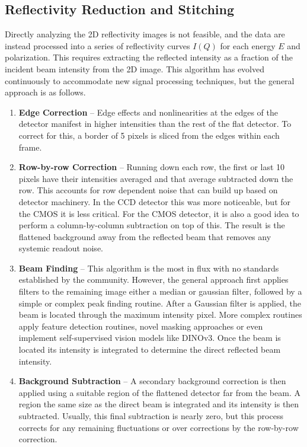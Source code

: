 \subsection{Reflectivity Reduction and Stitching}\label{sec:reflectivity-reduction-and-stitching}

Directly analyzing the 2D reflectivity images is not feasible, and the data are instead processed into a series of reflectivity curves \(I(Q)\) for each energy \(E\) and polarization. This requires extracting the reflected intensity as a fraction of the incident beam intensity from the 2D image. This algorithm has evolved continuously to accommodate new signal processing techniques, but the general approach is as follows.

\begin{enumerate}
\def\labelenumi{\arabic{enumi}.}
\item
  \textbf{Edge Correction} -- Edge effects and nonlinearities at the edges of the detector manifest in higher intensities than the rest of the flat detector. To correct for this, a border of 5 pixels is sliced from the edges within each frame.
\item
  \textbf{Row-by-row Correction} -- Running down each row, the first or last 10 pixels have their intensities averaged and that average subtracted down the row. This accounts for row dependent noise that can build up based on detector machinery. In the CCD detector this was more noticeable, but for the CMOS it is less critical. For the CMOS detector, it is also a good idea to perform a column-by-column subtraction on top of this. The result is the flattened background away from the reflected beam that removes any systemic readout noise.
\item
  \textbf{Beam Finding} -- This algorithm is the most in flux with no standards established by the community. However, the general approach first applies filters to the remaining image either a median or gaussian filter, followed by a simple or complex peak finding routine. After a Gaussian filter is applied, the beam is located through the maximum intensity pixel. More complex routines apply feature detection routines, novel masking approaches or even implement self-supervised vision models like DINOv3. Once the beam is located its intensity is integrated to determine the direct reflected beam intensity.
\item
  \textbf{Background Subtraction} -- A secondary background correction is then applied using a suitable region of the flattened detector far from the beam. A region the same size as the direct beam is integrated and its intensity is then subtracted. Usually, this final subtraction is nearly zero, but this process corrects for any remaining fluctuations or over corrections by the row-by-row correction.
\end{enumerate}

